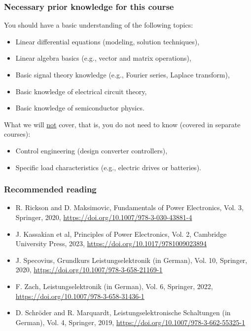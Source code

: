 \begin{frame}
	\frametitle{Necessary prior knowledge for this course}
	You should have a basic understanding of the following topics:
	\begin{itemize}
		\item Linear differential equations (modeling, solution techniques),
		\item Linear algebra basics (e.g., vector and matrix operations),
		\item Basic signal theory knowledge (e.g., Fourier series, Laplace transform),
		\item Basic knowledge of electrical circuit theory,
		\item Basic knowledge of semiconductor physics.
	\end{itemize}
	\vspace{0.5cm}
	What we will \underline{not} cover, that is, you do not need to know (covered in separate courses):
	\begin{itemize}
		\item Control engineering (design converter controllers),
		\item Specific load characteristics (e.g., electric drives or batteries).
	\end{itemize}
\end{frame}

\begin{frame}
	\frametitle{Recommended reading}
	\begin{itemize}
		\item R. Rickson and D. Maksimovic, Fundamentals of Power Electronics, Vol. 3, Springer, 2020, \url{https://doi.org/10.1007/978-3-030-43881-4}
		\item J. Kassakian et al, Principles of Power Electronics, Vol. 2,  Cambridge University Press, 2023, \url{https://doi.org/10.1017/9781009023894}
		\item J. Specovius, Grundkurs Leistungselektronik (in German), Vol. 10, Springer, 2020, \url{https://doi.org/10.1007/978-3-658-21169-1}
		\item F. Zach, Leistungselektronik (in German), Vol. 6, Springer, 2022, \url{https://doi.org/10.1007/978-3-658-31436-1}
		\item D. Schröder and R. Marquardt, Leistungselektronische	Schaltungen (in German), Vol. 4, Springer, 2019, \url{https://doi.org/10.1007/978-3-662-55325-1}
	\end{itemize}
\end{frame}
